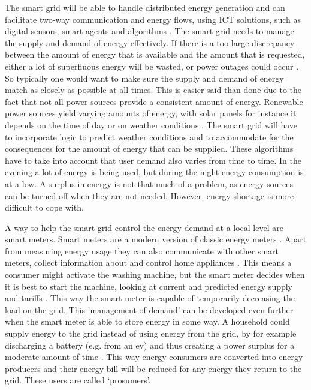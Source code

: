 The smart grid will be able to handle distributed energy generation and can facilitate two-way communication and energy flows, using ICT solutions, such as digital sensors, smart agents and algorithms \cite{FangMisraXueYang2012}. The smart grid needs to manage the supply and demand of energy effectively. If there is a too large discrepancy between the amount of energy that is available and the amount that is requested, either a lot of superfluous energy will be wasted, or power outages could occur \cite{FangMisraXueYang2012}. So typically one would want to make sure the supply and demand of energy match as closely as possible at all times. This is easier said than done due to the fact that not all power sources provide a consistent amount of energy. Renewable power sources yield varying amounts of energy, with solar panels for instance it depends on the time of day or on weather conditions \cite{RamchurnVitelingumRogersJennings2014}. The smart grid will have to incorporate logic to predict weather conditions and to accommodate for the consequences for the amount of energy that can be supplied. These algorithms have to take into account that user demand also varies from time to time. In the evening a lot of energy is being used, but during the night energy consumption is at a low. A surplus in energy is not that much of a problem, as energy sources can be turned off when they are not needed. However, energy shortage is more difficult to cope with.

A way to help the smart grid control the energy demand at a local level are smart meters. Smart meters are a modern version of classic energy meters \cite{FangMisraXueYang2012,Wang2011}. Apart from measuring energy usage they can also communicate with other smart meters, collect information about and control home appliances \cite{DepuruWangDevabhaktuni2011a}. This means a consumer might activate the washing machine, but the smart meter decides when it is best to start the machine, looking at current and predicted energy supply and tariffs  \cite{DepuruWangDevabhaktuni2011a}. This way the smart meter is capable of temporarily decreasing the load on the grid. This 'management of demand' can be developed even further when the smart meter is able to store energy in some way. A household could supply energy to the grid instead of using energy from the grid, by for example discharging a battery (e.g. from an \ac{ev}) and thus creating a power surplus for a moderate amount of time \cite{MwasiluJustoKimEtAl2014}. This way energy consumers are converted into energy producers and their energy bill will be reduced for any energy they return to the grid. These users are called `prosumers'.

